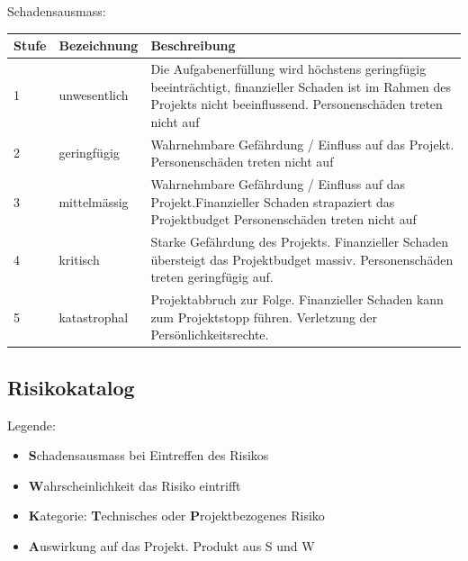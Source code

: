 \documentclass[a4paper]{scrreprt}
\begin{document}
\vspace{1em}
\noindent
Schadensausmass:

\vspace{1em}
\noindent
\begin{tabular}{|p{}|p{}|p{}|}
	\hline
	\textbf{Stufe} & \textbf{Bezeichnung} & \textbf{Beschreibung} \\
	\hline
	1 & unwesentlich & Die Aufgabenerfüllung wird höchstens geringfügig beeinträchtigt, finanzieller Schaden ist im Rahmen des Projekts nicht beeinflussend. Personenschäden treten nicht auf \\
	\hline
	2 & geringfügig & Wahrnehmbare Gefährdung / Einfluss auf das Projekt. Personenschäden treten nicht auf \\
	\hline
	3 & mittelmässig & Wahrnehmbare Gefährdung / Einfluss auf das Projekt.Finanzieller Schaden strapaziert das Projektbudget
	Personenschäden treten nicht auf \\
	\hline
	4 & kritisch & Starke Gefährdung des Projekts. Finanzieller Schaden übersteigt das Projektbudget massiv. Personenschäden treten geringfügig auf.\\
	\hline
	5 & katastrophal & Projektabbruch zur Folge. Finanzieller Schaden kann zum Projektstopp führen. Verletzung der Persönlichkeitsrechte.
	\\
	\hline
\end{tabular}

\subsection{Risikokatalog}
\label{sssec:Risikokatalog}
Legende:
\begin{itemize}
	\item \textbf{S}chadensausmass bei Eintreffen des Risikos
	\item \textbf{W}ahrscheinlichkeit das Risiko eintrifft
	\item \textbf{K}ategorie: \textbf{T}echnisches oder \textbf{P}rojektbezogenes Risiko
	\item \textbf{A}uswirkung auf das Projekt. Produkt aus S und W
\end{itemize}
\end{document}
